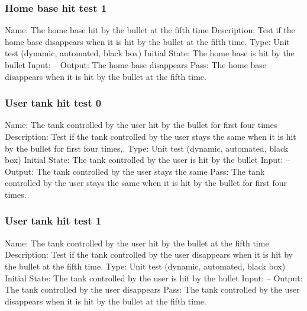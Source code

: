 \documentclass{article}
\begin{document}
\subsubsection{Home base hit test 1}
Name: The home base hit by the bullet at the fifth time\newline
Description: Test if the home base disappears when it is hit by the bullet  at the fifth time. \newline
Type: Unit test (dynamic, automated, black box) \newline
Initial State:  The home base is hit by the bullet \newline
Input: --\newline
Output: The home base disappears\newline
Pass: The home base disappears when it is hit by the bullet  at the fifth time. \newline

\subsubsection{User tank hit test 0}
Name: The tank controlled by the user hit by the bullet for first four times\newline
Description: Test if the tank controlled by the user stays the same when it is hit by the bullet for first four times,. \newline
Type: Unit test (dynamic, automated, black box) \newline
Initial State:  The tank controlled by the user is hit by the bullet \newline
Input: --\newline
Output: The tank controlled by the user stays the same \newline
Pass: The tank controlled by the user stays the same when it is hit by the bullet for first four times. \newline

\subsubsection{User tank hit test 1}
Name:  The tank controlled by the user hit by the bullet at the fifth time\newline
Description: Test if the tank controlled by the user disappears when it is hit by the bullet at the fifth time. \newline
Type: Unit test (dynamic, automated, black box) \newline
Initial State:  The tank controlled by the user is hit by the bullet \newline
Input: --\newline
Output: The tank controlled by the user disappears \newline
Pass: The tank controlled by the user disappears when it is hit by the bullet at the fifth time. \newline
\end{document}
